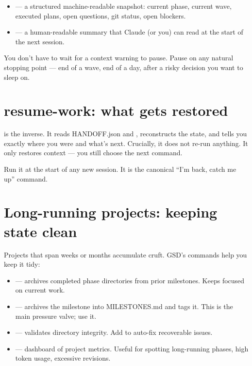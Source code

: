 \documentclass[11pt,letterpaper,openany]{book}
\begin{document}
\begin{itemize}[itemsep=2pt]
  \item {} --- a structured machine-readable snapshot: current phase, current wave, executed plans, open questions, git status, open blockers.
  \item {} --- a human-readable summary that Claude (or you) can read at the start of the next session.
\end{itemize}

You don't have to wait for a context warning to pause. Pause on any natural stopping point --- end of a wave, end of a day, after a risky decision you want to sleep on.

\section{resume-work: what gets restored}

 is the inverse. It reads HANDOFF.json and , reconstructs the state, and tells you exactly where you were and what's next. Crucially, it does not re-run anything. It only restores context --- you still choose the next command.

Run it at the start of any new session. It is the canonical ``I'm back, catch me up'' command.

\section{Long-running projects: keeping state clean}

Projects that span weeks or months accumulate cruft. GSD's commands help you keep it tidy:

\begin{itemize}[itemsep=2pt]
  \item {} --- archives completed phase directories from prior milestones. Keeps  focused on current work.
  \item {} --- archives the milestone into MILESTONES.md and tags it. This is the main pressure valve; use it.
  \item {} --- validates  directory integrity. Add  to auto-fix recoverable issues.
  \item {} --- dashboard of project metrics. Useful for spotting long-running phases, high token usage, excessive revisions.
\end{itemize}
\end{document}
